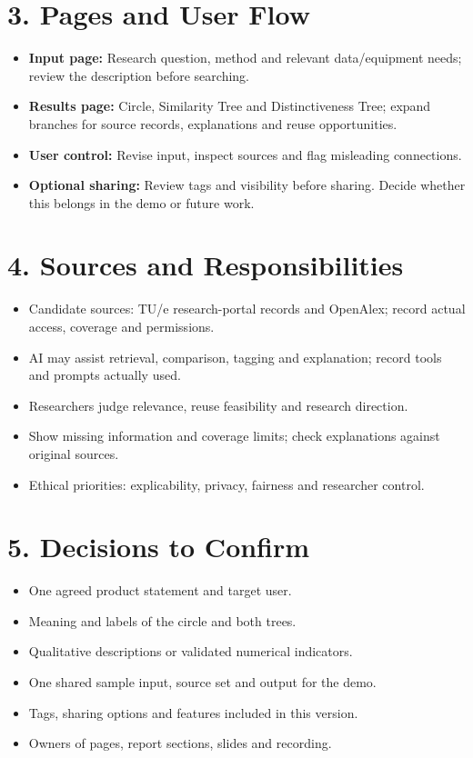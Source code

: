\documentclass[10pt,a4paper]{article}
\newcommand{\checkitem}{\item[$\square$]}
\begin{document}
\section*{3. Pages and User Flow}
\begin{itemize}
\item \textbf{Input page:} Research question, method and relevant data/equipment needs; review the description before searching.
\item \textbf{Results page:} Circle, Similarity Tree and Distinctiveness Tree; expand branches for source records, explanations and reuse opportunities.
\item \textbf{User control:} Revise input, inspect sources and flag misleading connections.
\item \textbf{Optional sharing:} Review tags and visibility before sharing. Decide whether this belongs in the demo or future work.
\end{itemize}

\section*{4. Sources and Responsibilities}
\begin{itemize}
\item Candidate sources: TU/e research-portal records and OpenAlex; record actual access, coverage and permissions.
\item AI may assist retrieval, comparison, tagging and explanation; record tools and prompts actually used.
\item Researchers judge relevance, reuse feasibility and research direction.
\item Show missing information and coverage limits; check explanations against original sources.
\item Ethical priorities: explicability, privacy, fairness and researcher control.
\end{itemize}

\newpage
\section*{5. Decisions to Confirm}
\begin{itemize}
\checkitem One agreed product statement and target user.
\checkitem Meaning and labels of the circle and both trees.
\checkitem Qualitative descriptions or validated numerical indicators.
\checkitem One shared sample input, source set and output for the demo.
\checkitem Tags, sharing options and features included in this version.
\checkitem Owners of pages, report sections, slides and recording.
\end{itemize}
\end{document}
